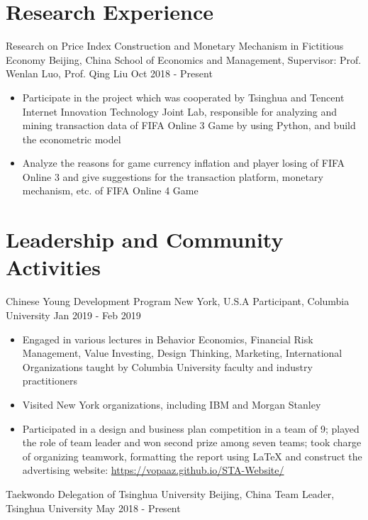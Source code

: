 \documentclass{resumeEN}
\begin{document}
    \section{Research Experience}

    \Experience
    {Research on Price Index Construction and Monetary Mechanism in Fictitious Economy}
    {Beijing, China}
    {School of Economics and Management, Supervisor: Prof. Wenlan Luo, Prof. Qing Liu}
    {Oct 2018 - Present}

    \begin{itemize}
        \item Participate in the project which was cooperated by Tsinghua and Tencent Internet Innovation Technology Joint Lab, responsible for analyzing and mining transaction data of FIFA Online 3 Game by using Python, and build the econometric model
        \item Analyze the reasons for game currency inflation and player losing of FIFA Online 3 and give suggestions for the transaction platform, monetary mechanism, etc. of FIFA Online 4 Game
    \end{itemize}


    \section{Leadership and Community Activities}

    \Experience
    {Chinese Young Development Program}
    {New York, U.S.A}
    {Participant, Columbia University}
    {Jan 2019 - Feb 2019}

    \begin{itemize}
        \item Engaged in various lectures in Behavior Economics, Financial Risk Management, Value Investing, Design Thinking, Marketing, International Organizations taught by Columbia University faculty and industry practitioners
        \item Visited New York organizations, including IBM and Morgan Stanley
        \item Participated in a design and business plan competition in a team of 9; played the role of team leader and won second prize among seven teams; took charge of organizing teamwork, formatting the report using {\LaTeX} and construct the advertising website: \href{https://vopaaz.github.io/STA-Website/}{https://vopaaz.github.io/STA-Website/}
    \end{itemize}

    \Experience
    {Taekwondo Delegation of Tsinghua University}
    {Beijing, China}
    {Team Leader, Tsinghua University}
    {May 2018 - Present}
\end{document}
